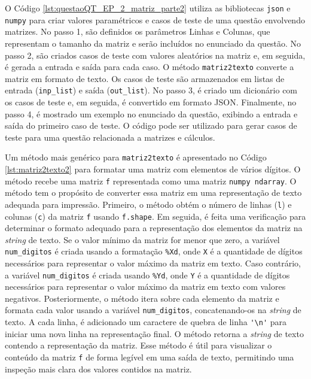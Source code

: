 O Código \ref{lst:questaoQT_EP_2_matriz_parte2} utiliza as bibliotecas \verb|json| e \verb|numpy| para criar valores paramétricos e casos de teste de uma questão envolvendo matrizes. No passo 1, são definidos os parâmetros Linhas e Colunas, que representam o tamanho da matriz e serão incluídos no enunciado da questão. No passo 2, são criados casos de teste com valores aleatórios na matriz e, em seguida, é gerada a entrada e saída para cada caso. O método \verb|matriz2texto| converte a matriz em formato de texto. Os casos de teste são armazenados em listas de entrada (\verb|inp_list|) e saída (\verb|out_list|). No passo 3, é criado um dicionário com os casos de teste e, em seguida, é convertido em formato JSON. Finalmente, no passo 4, é mostrado um exemplo no enunciado da questão, exibindo a entrada e saída do primeiro caso de teste. O código pode ser utilizado para gerar casos de teste para uma questão relacionada a matrizes e cálculos.

Um método mais genérico para \verb|matriz2texto| é apresentado no Código \ref{lst:matriz2texto2} para formatar uma matriz com elementos de vários dígitos. O método recebe uma matriz \verb|f| representada como uma matriz \verb|numpy ndarray|. O método tem o propósito de converter essa matriz em uma representação de texto adequada para impressão. Primeiro, o método obtém o número de linhas (\verb|l|) e colunas (\verb|c|) da matriz \verb|f| usando \verb|f.shape|. Em seguida, é feita uma verificação para determinar o formato adequado para a representação dos elementos da matriz na \textit{string} de texto. Se o valor mínimo da matriz for menor que zero, a variável \verb|num_digitos| é criada usando a formatação \verb|%Xd|, onde \verb|X| é a quantidade de dígitos necessários para representar o valor máximo da matriz em texto. Caso contrário, a variável \verb|num_digitos| é criada usando \verb|%Yd|, onde \verb|Y| é a quantidade de dígitos necessários para representar o valor máximo da matriz em texto com valores negativos. Posteriormente, o método itera sobre cada elemento da matriz e formata cada valor usando a variável \verb|num_digitos|, concatenando-os na \textit{string} de texto. A cada linha, é adicionado um caractere de quebra de linha \verb|'\n'| para iniciar uma nova linha na representação final. O método retorna a \textit{string} de texto contendo a representação da matriz. Esse método é útil para visualizar o conteúdo da matriz \verb|f| de forma legível em uma saída de texto, permitindo uma inspeção mais clara dos valores contidos na matriz.

